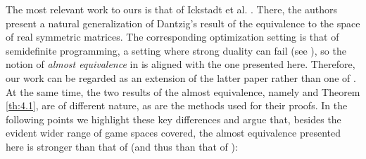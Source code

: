 \documentclass[11pt, twoside]{article}
\numberwithin{equation}{section}
\theoremstyle{definition}
\begin{document}
The most relevant work to ours is that of Ickstadt et al. \cite{ickstadt2024semidefinite}. There, the authors present a natural generalization of Dantzig's \cite{dantzig1951proof} result of the equivalence to the space of real symmetric matrices. The corresponding optimization setting is that of semidefinite programming, a setting where strong duality can fail (see \cite[Example 4.1.2]{wolkowicz2012handbook}), so the notion of \textit{almost equivalence} in \cite{ickstadt2024semidefinite} is aligned with the one presented here. Therefore, our work can be regarded as an extension of the latter paper rather than one of \cite{adler2013equivalence, dantzig2016linear, VonNeumann1944-VONTOG-4,von2024zero}. At the same time, the two results of the almost equivalence, namely \cite[Theorem 5.3]{ickstadt2024semidefinite} and Theorem \ref{th:4.1}, are of different nature, as are the methods used for their proofs. In the following points we highlight these key differences and argue that, besides the evident wider range of game spaces covered, the almost equivalence presented here is stronger than that of \cite{ickstadt2024semidefinite} (and thus than that of \cite{dantzig1951proof}):\vspace{-0.2cm}
\end{document}
